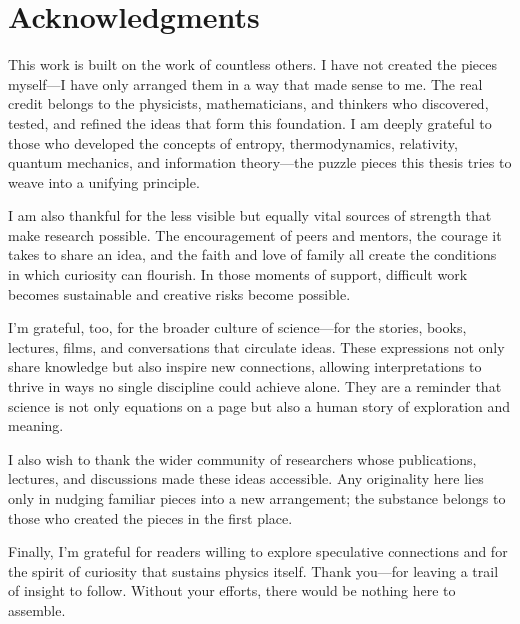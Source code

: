\section*{Acknowledgments}
This work is built on the work of countless others. I have not created the pieces myself—I have only arranged them in a way that made sense to me. The real credit belongs to the physicists, mathematicians, and thinkers who discovered, tested, and refined the ideas that form this foundation. I am deeply grateful to those who developed the concepts of entropy, thermodynamics, relativity, quantum mechanics, and information theory—the puzzle pieces this thesis tries to weave into a unifying principle.

I am also thankful for the less visible but equally vital sources of strength that make research possible. The encouragement of peers and mentors, the courage it takes to share an idea, and the faith and love of family all create the conditions in which curiosity can flourish. In those moments of support, difficult work becomes sustainable and creative risks become possible.

I’m grateful, too, for the broader culture of science—for the stories, books, lectures, films, and conversations that circulate ideas. These expressions not only share knowledge but also inspire new connections, allowing interpretations to thrive in ways no single discipline could achieve alone. They are a reminder that science is not only equations on a page but also a human story of exploration and meaning.

I also wish to thank the wider community of researchers whose publications, lectures, and discussions made these ideas accessible. Any originality here lies only in nudging familiar pieces into a new arrangement; the substance belongs to those who created the pieces in the first place.

Finally, I’m grateful for readers willing to explore speculative connections and for the spirit of curiosity that sustains physics itself. Thank you—for leaving a trail of insight to follow. Without your efforts, there would be nothing here to assemble.